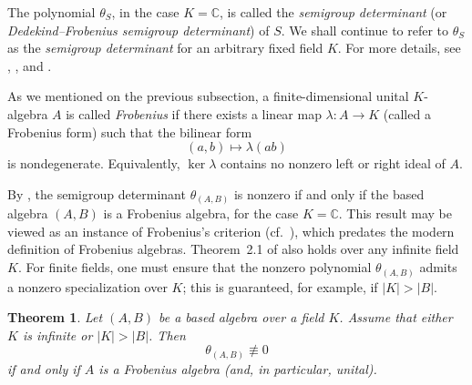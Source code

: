 \documentclass[11pt,reqno]{amsart}
\theoremstyle{plain}
\newtheorem{thm}{Theorem}[section]
\theoremstyle{remark}
\theoremstyle{definition}
\newcommand{\DDet}{\mathop{\mathrm{Det}}\nolimits}
\begin{document}
The polynomial $\theta_S$, in the case $K = \mathbb{C}$, is called the 
\emph{semigroup determinant} (or \emph{Dedekind--Frobenius semigroup determinant}) of $S$. 
We shall continue to refer to $\theta_S$ as the \emph{semigroup determinant} for an arbitrary fixed field $K$.
For more details, see \cite{Frobenius1903theorie}, \cite[Chapter~16]{Okn}, and \cite{Ste-Fac-det}.

As we mentioned on the previous subsection, a finite-dimensional unital $K$-algebra $A$ is called \emph{Frobenius} if there exists 
a linear map $\lambda : A \to K$ (called a Frobenius form) such that the bilinear form
\[
(a,b) \mapsto \lambda(ab)
\]
is nondegenerate. Equivalently, $\ker \lambda$ contains no nonzero left or right ideal of $A$.

By \cite[Theorem~2.1]{Ste-Fac-det}, the semigroup determinant $\theta_{(A,B)}$ is nonzero
if and only if the based algebra $(A,B)$ is a Frobenius algebra, for the case $K=\mathbb{C}$.
This result may be viewed as an instance of Frobenius’s criterion
(cf.\ \cite[§16.82]{LamTY}), which predates the modern definition of Frobenius algebras.
Theorem~2.1 of \cite{Ste-Fac-det} also holds over any infinite field $K$.
For finite fields, one must ensure that the nonzero polynomial $\theta_{(A,B)}$
admits a nonzero specialization over $K$; this is guaranteed, for example, if
$|K| > |B|$.

\begin{thm}\label{DetAB}
Let $(A,B)$ be a based algebra over a field $K$. Assume that either $K$ is infinite or $|K| > |B|$. Then
\[
\theta_{(A,B)} \not\equiv 0
\]
if and only if $A$ is a Frobenius algebra (and, in particular, unital).
\end{thm}
\end{document}
